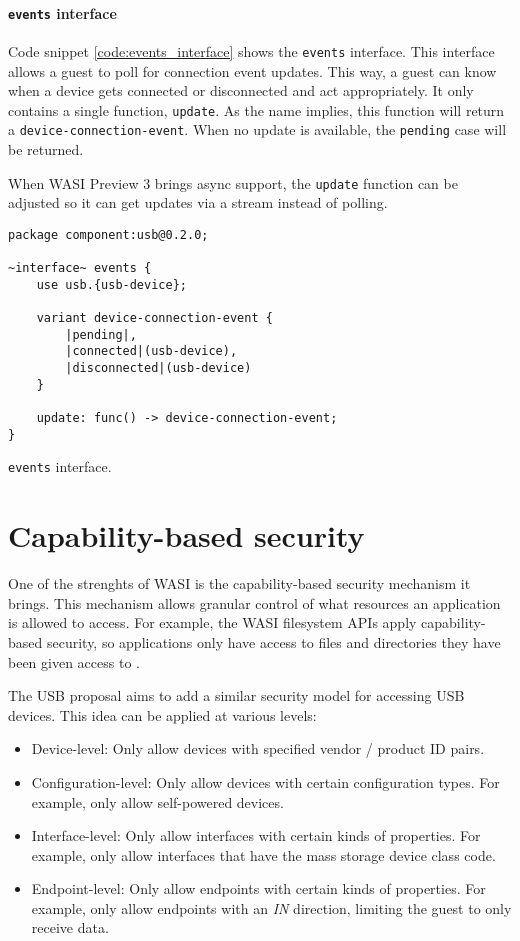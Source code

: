 \paragraph{\texttt{events} interface}

Code snippet \ref{code:events_interface} shows the \texttt{events} interface. This interface allows a guest to poll for connection event updates. This way, a guest can know when a device gets connected or disconnected and act appropriately. It only contains a single function, \texttt{update}. As the name implies, this function will return a \texttt{device-connection-event}. When no update is available, the \texttt{pending} case will be returned.

When \acrshort{WASI} Preview 3 brings async support, the \texttt{update} function can be adjusted so it can get updates via a stream instead of polling.\\

\begin{code}
\begin{lstlisting}[language=wit, tabsize=4]
package component:usb@0.2.0;

~interface~ events {
	use usb.{usb-device};

	variant device-connection-event {
		|pending|,
		|connected|(usb-device),
		|disconnected|(usb-device)
	}

	update: func() -> device-connection-event;
}
\end{lstlisting}
\caption{\texttt{events} interface.}
\label{code:events_interface}
\end{code}

\section{Capability-based security}
\label{section:capability_based_security}
One of the strenghts of \acrshort{WASI} is the capability-based security mechanism it brings. This mechanism allows granular control of what resources an application is allowed to access. For example, the \acrshort{WASI} filesystem APIs apply capability-based security, so applications only have access to files and directories they have been given access to \cite{wasi_security}.

The \acrshort{USB} proposal aims to add a similar security model for accessing USB devices. This idea can be applied at various levels:
\begin{itemize}
\item Device-level: Only allow devices with specified vendor / product ID pairs.
\item Configuration-level: Only allow devices with certain configuration types. For example, only allow self-powered devices.
\item Interface-level: Only allow interfaces with certain kinds of properties. For example, only allow interfaces that have the mass storage device class code.
\item Endpoint-level: Only allow endpoints with certain kinds of properties. For example, only allow endpoints with an \textit{IN} direction, limiting the guest to only receive data.
\end{itemize}

